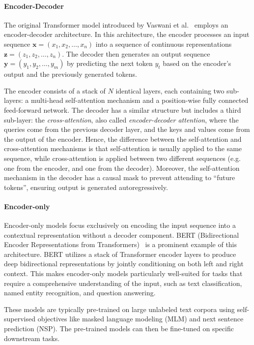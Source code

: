 \paragraph{Encoder-Decoder}
The original Transformer model introduced by Vaswani et al.~\cite{vaswani_attention_2017} employs an encoder-decoder architecture. In this architecture, the encoder processes an input sequence $\mathbf{x} = (x_1, x_2, \dots, x_n)$ into a sequence of continuous representations $\mathbf{z} = (z_1, z_2, \dots, z_n)$. The decoder then generates an output sequence $\mathbf{y} = (y_1, y_2, \dots, y_m)$ by predicting the next token $y_t$ based on the encoder's output and the previously generated tokens.

The encoder consists of a stack of $N$ identical layers, each containing two sub-layers: a multi-head self-attention mechanism and a position-wise fully connected feed-forward network. The decoder has a similar structure but includes a third sub-layer: the \emph{cross-attention}, also called \emph{encoder-decoder attention}, where the queries come from the previous decoder layer, and the keys and values come from the output of the encoder. Hence, the difference between the self-attention and cross-attention mechanisms is that self-attention is usually applied to the same sequence, while cross-attention is applied between two different sequences (e.g. one from the encoder, and one from the decoder). Moreover, the self-attention mechanism in the decoder has a causal mask to prevent attending to ``future tokens'', ensuring output is generated autoregressively.

\paragraph{Encoder-only}
Encoder-only models focus exclusively on encoding the input sequence into a contextual representation without a decoder component. BERT (Bidirectional Encoder Representations from Transformers)~\cite{devlin_bert_2019} is a prominent example of this architecture. BERT utilizes a stack of Transformer encoder layers to produce deep bidirectional representations by jointly conditioning on both left and right context. This makes encoder-only models particularly well-suited for tasks that require a comprehensive understanding of the input, such as text classification, named entity recognition, and question answering.

These models are typically pre-trained on large unlabeled text corpora using self-supervised objectives like masked language modeling (MLM) and next sentence prediction (NSP). The pre-trained models can then be fine-tuned on specific downstream tasks.

